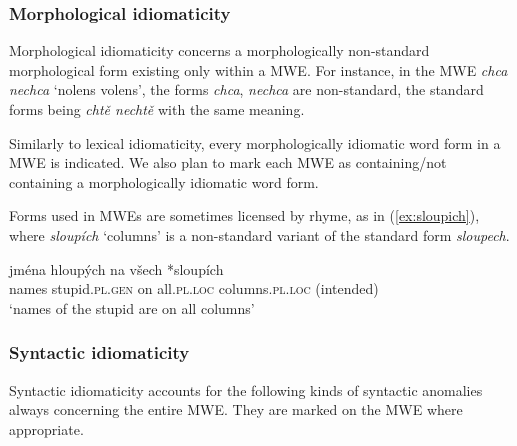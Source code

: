 \documentclass[output=paper,colorlinks,citecolor=brown]{langscibook}
\begin{document}
\subsubsection{Morphological idiomaticity}
\label{sec:idiom-morph}
Morphological idiomaticity concerns a morphologically non-standard morphological form existing only within a MWE. For instance, in the MWE \emph{chca nechca} ‘nolens volens’,
the forms \emph{chca}, \emph{nechca} are non-standard, the standard forms being \emph{chtě nechtě} with the same meaning.

Similarly to lexical idiomaticity, every morphologically idiomatic word form in a MWE is indicated. We also plan to mark each MWE as containing\slash not containing a morphologically idiomatic word form.

Forms used in MWEs are sometimes licensed by rhyme, as in (\ref{ex:sloupich}), where \emph{sloupích} ‘columns’ is a non-standard variant of the standard form \emph{sloupech}.

\ea \label{ex:sloupich}
\gll jména hloupých na všech *sloupích\\
     names stupid.\textsc{pl.gen} on all.\textsc{pl.loc} columns.\textsc{pl.loc} (intended)\\
\glt `names of the stupid are on all columns'
\z

\subsubsection{Syntactic idiomaticity}
\label{sec:idiom-synt}
Syntactic idiomaticity accounts for the following kinds of syntactic anomalies always concerning the entire MWE. They are marked on the MWE where appropriate.
\end{document}
